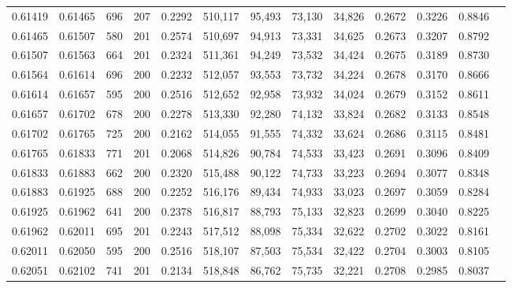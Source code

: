 \begin{tabular}{rrrrrrrrrrrrr}
0.61419 & 0.61465 &   696 & 207 &                                     0.2292 & 510,117 &  95,493 &  73,130 &  34,826 & 0.2672 & 0.3226 & 0.8846 \\
0.61465 & 0.61507 &   580 & 201 &                                     0.2574 & 510,697 &  94,913 &  73,331 &  34,625 & 0.2673 & 0.3207 & 0.8792 \\
0.61507 & 0.61563 &   664 & 201 &                                     0.2324 & 511,361 &  94,249 &  73,532 &  34,424 & 0.2675 & 0.3189 & 0.8730 \\
0.61564 & 0.61614 &   696 & 200 &                                     0.2232 & 512,057 &  93,553 &  73,732 &  34,224 & 0.2678 & 0.3170 & 0.8666 \\
0.61614 & 0.61657 &   595 & 200 &                                     0.2516 & 512,652 &  92,958 &  73,932 &  34,024 & 0.2679 & 0.3152 & 0.8611 \\
0.61657 & 0.61702 &   678 & 200 &                                     0.2278 & 513,330 &  92,280 &  74,132 &  33,824 & 0.2682 & 0.3133 & 0.8548 \\
0.61702 & 0.61765 &   725 & 200 &                                     0.2162 & 514,055 &  91,555 &  74,332 &  33,624 & 0.2686 & 0.3115 & 0.8481 \\
0.61765 & 0.61833 &   771 & 201 &                                     0.2068 & 514,826 &  90,784 &  74,533 &  33,423 & 0.2691 & 0.3096 & 0.8409 \\
0.61833 & 0.61883 &   662 & 200 &                                     0.2320 & 515,488 &  90,122 &  74,733 &  33,223 & 0.2694 & 0.3077 & 0.8348 \\
0.61883 & 0.61925 &   688 & 200 &                                     0.2252 & 516,176 &  89,434 &  74,933 &  33,023 & 0.2697 & 0.3059 & 0.8284 \\
0.61925 & 0.61962 &   641 & 200 &                                     0.2378 & 516,817 &  88,793 &  75,133 &  32,823 & 0.2699 & 0.3040 & 0.8225 \\
0.61962 & 0.62011 &   695 & 201 &                                     0.2243 & 517,512 &  88,098 &  75,334 &  32,622 & 0.2702 & 0.3022 & 0.8161 \\
0.62011 & 0.62050 &   595 & 200 &                                     0.2516 & 518,107 &  87,503 &  75,534 &  32,422 & 0.2704 & 0.3003 & 0.8105 \\
0.62051 & 0.62102 &   741 & 201 &                                     0.2134 & 518,848 &  86,762 &  75,735 &  32,221 & 0.2708 & 0.2985 & 0.8037 \\

\end{tabular}

